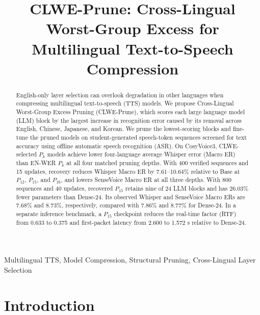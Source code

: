 \documentclass{article}
\title{CLWE-Prune: Cross-Lingual Worst-Group Excess for Multilingual Text-to-Speech Compression}
\begin{document}
\ninept
%
\maketitle

\begingroup
\renewcommand{\thefootnote}{\fnsymbol{footnote}}
\endgroup
%
\begin{abstract}
English-only layer selection can overlook degradation in other
languages when compressing multilingual text-to-speech (TTS) models.
We propose Cross-Lingual Worst-Group Excess Pruning (CLWE-Prune),
which scores each large language model (LLM) block by the largest
increase in recognition error caused by its removal across English,
Chinese, Japanese, and Korean. We prune the lowest-scoring blocks
and fine-tune the pruned models on student-generated speech-token
sequences screened for text accuracy using offline automatic speech
recognition (ASR). On CosyVoice3, CLWE-selected \(P_k\) models achieve
lower four-language average Whisper error (Macro ER) than
EN-WER \(P_k\) at all four matched pruning depths. With 400 verified
sequences and 15 updates, recovery reduces Whisper Macro ER by
7.61--10.64\% relative to Base at
\(P_{12}\), \(P_{15}\), and \(P_{16}\), and lowers SenseVoice Macro ER
at all three depths. With 800 sequences and 40 updates, recovered
\(P_{15}\) retains nine of 24 LLM blocks and has 26.03\% fewer
parameters than Dense-24. Its observed Whisper and SenseVoice Macro ERs
are 7.68\% and 8.73\%, respectively, compared with
7.86\% and 8.77\% for Dense-24. In a separate inference benchmark,
a \(P_{15}\) checkpoint reduces the real-time factor (RTF) from
0.633 to 0.375 and first-packet latency from 2.600 to 1.572 s
relative to Dense-24.
\end{abstract}
%
\begin{keywords}
Multilingual TTS, Model Compression, Structural Pruning, Cross-Lingual Layer Selection
\end{keywords}
%

\section{Introduction}
\label{sec:intro}
\end{document}
